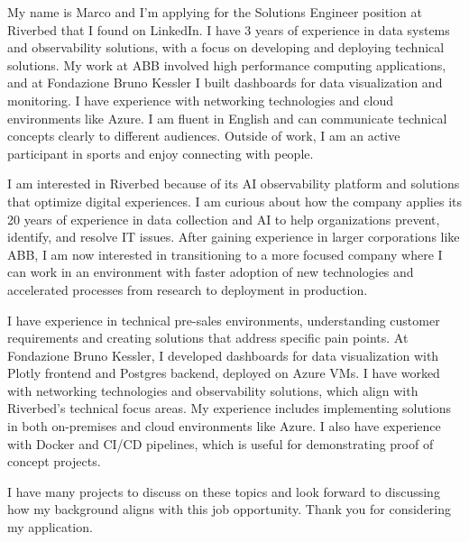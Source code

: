\documentclass[11pt, a4paper]{awesome-cv}
\begin{document}
\makecvheader[R]

\begin{cvletter}

My name is Marco and I'm applying for the Solutions Engineer position at Riverbed that I found on LinkedIn. I have 3 years of experience in data systems and observability solutions, with a focus on developing and deploying technical solutions. My work at ABB involved high performance computing applications, and at Fondazione Bruno Kessler I built dashboards for data visualization and monitoring. I have experience with networking technologies and cloud environments like Azure. I am fluent in English and can communicate technical concepts clearly to different audiences. Outside of work, I am an active participant in sports and enjoy connecting with people.


I am interested in Riverbed because of its AI observability platform and solutions that optimize digital experiences. I am curious about how the company applies its 20 years of experience in data collection and AI to help organizations prevent, identify, and resolve IT issues. After gaining experience in larger corporations like ABB, I am now interested in transitioning to a more focused company where I can work in an environment with faster adoption of new technologies and accelerated processes from research to deployment in production.


I have experience in technical pre-sales environments, understanding customer requirements and creating solutions that address specific pain points. At Fondazione Bruno Kessler, I developed dashboards for data visualization with Plotly frontend and Postgres backend, deployed on Azure VMs. I have worked with networking technologies and observability solutions, which align with Riverbed's technical focus areas. My experience includes implementing solutions in both on-premises and cloud environments like Azure. I also have experience with Docker and CI/CD pipelines, which is useful for demonstrating proof of concept projects.

I have many projects to discuss on these topics and look forward to discussing how my background aligns with this job opportunity. Thank you for considering my application.

\end{cvletter}

\makeletterclosing
\end{document}
